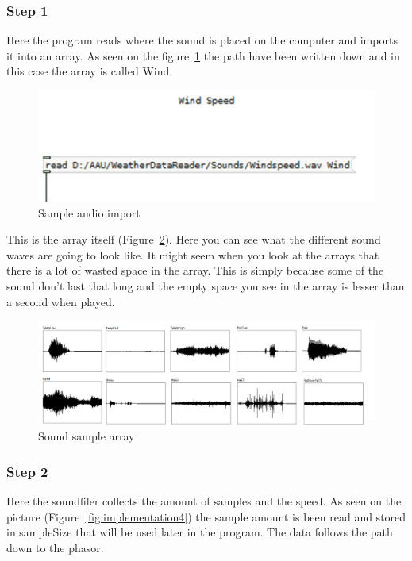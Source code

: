 \subsubsection*{Step 1} %
\label{ssub:step_1}

Here the program reads where the sound is placed on the computer and imports it into an array. 
As seen on the figure~\ref*{fig:implementation2} the path have been written down and in this case the array is called Wind.

\begin{figure}[!htbp]
    \centering
    \includegraphics[width=.7\textwidth]{images/Implementation2.png}
    \caption{Sample audio import}
    \label{fig:implementation2}
\end{figure}

This is the array itself (Figure~\ref{fig:implementation3}). 
Here you can see what the different sound waves are going to look like. 
It might seem when you look at the arrays that there is a lot of wasted space in the array. 
This is simply because some of the sound don’t last that long and the empty space you see in the array is lesser than a second when played.

\begin{figure}[!htbp]
    \centering
    \includegraphics[width=.5\textwidth]{images/Implementation3.png}
    \caption{Sound sample array}
    \label{fig:implementation3}
\end{figure}



\subsubsection*{Step 2} %
\label{ssub:step_2}

Here the soundfiler collects the amount of samples and the speed. 
As seen on the picture (Figure~\ref{fig:implementation4}) the sample amount is been read and stored in sampleSize that will be used later in the program. 
The data follows the path down to the phasor.

